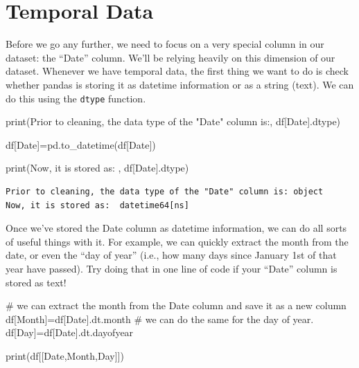 \documentclass[
  letterpaper,
  DIV=11,
  numbers=noendperiod]{scrreprt}
\newenvironment{Shaded}{\begin{snugshade}}{\end{snugshade}}
\newcommand{\BuiltInTok}[1]{\textcolor[rgb]{0.00,0.23,0.31}{#1}}
\newcommand{\CommentTok}[1]{\textcolor[rgb]{0.37,0.37,0.37}{#1}}
\newcommand{\NormalTok}[1]{\textcolor[rgb]{0.00,0.23,0.31}{#1}}
\newcommand{\OperatorTok}[1]{\textcolor[rgb]{0.37,0.37,0.37}{#1}}
\newcommand{\StringTok}[1]{\textcolor[rgb]{0.13,0.47,0.30}{#1}}
\begin{document}
\hypertarget{temporal-data}{%
\section{Temporal Data}\label{temporal-data}}

Before we go any further, we need to focus on a very special column in
our dataset: the ``Date'' column. We'll be relying heavily on this
dimension of our dataset. Whenever we have temporal data, the first
thing we want to do is check whether pandas is storing it as datetime
information or as a string (text). We can do this using the
\texttt{dtype} function.

\begin{Shaded}
\begin{Highlighting}[]
\BuiltInTok{print}\NormalTok{(}\StringTok{\textquotesingle{}Prior to cleaning, the data type of the "Date" column is:\textquotesingle{}}\NormalTok{, df[}\StringTok{\textquotesingle{}Date\textquotesingle{}}\NormalTok{].dtype)}

\NormalTok{df[}\StringTok{\textquotesingle{}Date\textquotesingle{}}\NormalTok{]}\OperatorTok{=}\NormalTok{pd.to\_datetime(df[}\StringTok{\textquotesingle{}Date\textquotesingle{}}\NormalTok{])}

\BuiltInTok{print}\NormalTok{(}\StringTok{\textquotesingle{}Now, it is stored as: \textquotesingle{}}\NormalTok{, df[}\StringTok{\textquotesingle{}Date\textquotesingle{}}\NormalTok{].dtype)}
\end{Highlighting}
\end{Shaded}

\begin{verbatim}
Prior to cleaning, the data type of the "Date" column is: object
Now, it is stored as:  datetime64[ns]
\end{verbatim}

Once we've stored the Date column as datetime information, we can do all
sorts of useful things with it. For example, we can quickly extract the
month from the date, or even the ``day of year'' (i.e., how many days
since January 1st of that year have passed). Try doing that in one line
of code if your ``Date'' column is stored as text!

\begin{Shaded}
\begin{Highlighting}[]
\CommentTok{\# we can extract the month from the Date column and save it as a new column }
\NormalTok{df[}\StringTok{\textquotesingle{}Month\textquotesingle{}}\NormalTok{]}\OperatorTok{=}\NormalTok{df[}\StringTok{\textquotesingle{}Date\textquotesingle{}}\NormalTok{].dt.month}
\CommentTok{\# we can do the same for the day of year. }
\NormalTok{df[}\StringTok{\textquotesingle{}Day\textquotesingle{}}\NormalTok{]}\OperatorTok{=}\NormalTok{df[}\StringTok{\textquotesingle{}Date\textquotesingle{}}\NormalTok{].dt.dayofyear}

\BuiltInTok{print}\NormalTok{(df[[}\StringTok{\textquotesingle{}Date\textquotesingle{}}\NormalTok{,}\StringTok{\textquotesingle{}Month\textquotesingle{}}\NormalTok{,}\StringTok{\textquotesingle{}Day\textquotesingle{}}\NormalTok{]])}
\end{Highlighting}
\end{Shaded}
\end{document}
